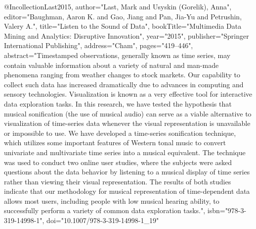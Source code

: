 @Incollection{Last2015,
author="Last, Mark
and Usyskin (Gorelik), Anna",
editor="Baughman, Aaron K.
and Gao, Jiang
and Pan, Jia-Yu
and Petrushin, Valery A.",
title="Listen to the Sound of Data",
bookTitle="Multimedia Data Mining and Analytics: Disruptive Innovation",
year="2015",
publisher="Springer International Publishing",
address="Cham",
pages="419--446",
abstract="Timestamped observations, generally known as time series, may contain valuable information about a variety of natural and man-made phenomena ranging from weather changes to stock markets. Our capability to collect such data has increased dramatically due to advances in computing and sensory technologies. Visualization is known as a very effective tool for interactive data exploration tasks. In this research, we have tested the hypothesis that musical sonification (the use of musical audio) can serve as a viable alternative to visualization of time-series data whenever the visual representation is unavailable or impossible to use. We have developed a time-series sonification technique, which utilizes some important features of Western tonal music to convert univariate and multivariate time series into a musical equivalent. The technique was used to conduct two online user studies, where the subjects were asked questions about the data behavior by listening to a musical display of time series rather than viewing their visual representation. The results of both studies indicate that our methodology for musical representation of time-dependent data allows most users, including people with low musical hearing ability, to successfully perform a variety of common data exploration tasks.",
isbn="978-3-319-14998-1",
doi="10.1007/978-3-319-14998-1_19"
}





